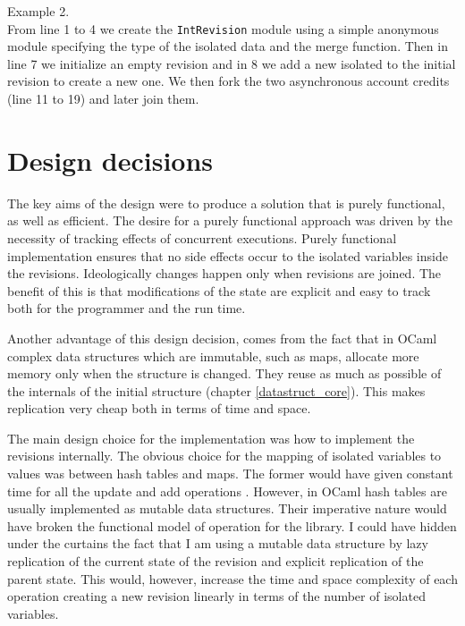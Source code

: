 \documentclass[12pt,twoside,notitlepage]{report}
\begin{document}
{Example 2.\\

From line 1 to 4 we create the {\tt IntRevision} module using a simple anonymous module specifying the type of the isolated data and the merge function. Then in line 7 we initialize an empty revision and in 8 we add a new isolated to the initial revision to create a new one. We then fork the two asynchronous account credits (line 11 to 19) and later join them. 


\section{Design decisions}
\label{design_decisions}
The key aims of the design were to produce a solution that is purely functional, as well as efficient. The desire for a purely functional approach was driven by the necessity of tracking effects of concurrent executions. Purely functional implementation ensures that no side effects occur to the isolated variables inside the revisions. Ideologically changes happen only when revisions are joined. The benefit of this is that modifications of the state are explicit and easy to track both for the programmer and the run time. 

Another advantage of this design decision, comes from the fact that in OCaml complex data structures which are immutable, such as maps, allocate more memory only when the structure is changed. They reuse as much as possible of the internals of the initial structure (chapter \ref{datastruct_core}). This makes replication very cheap both in terms of time and space.

The main design choice for the implementation was how to implement the revisions internally. The obvious choice for the mapping of isolated variables to values was between hash tables and maps. The former would have given constant time for all the update and add operations \cite{cormen}. However, in OCaml hash tables are usually implemented as mutable data structures. Their imperative nature would have broken the functional model of operation for the library. I could have hidden under the curtains the fact that I am using a mutable data structure by lazy replication of the current state of the revision and explicit replication of the parent state. This would, however, increase the time and space complexity of each operation creating a new revision linearly in terms of the number of isolated variables.

}
\end{document}
